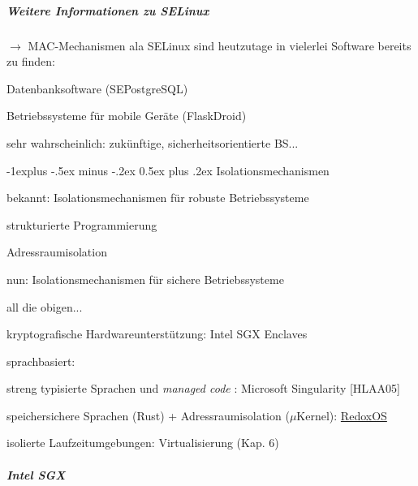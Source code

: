 \documentclass[a4paper]{article}
\makeatletter
\renewcommand{\subsection}{\@startsection{subsection}{2}{0mm}%
 {-1explus -.5ex minus -.2ex}%
 {0.5ex plus .2ex}%
 {\normalfont\normalsize\bfseries}}
\makeatother
\begin{document}
\begin{multicols}{3}
    \subparagraph{Weitere Informationen zu
        SELinux}

    $\rightarrow$ MAC-Mechanismen ala SELinux sind
    heutzutage in vielerlei Software bereits zu finden:

    \begin{itemize*}
        \item
        Datenbanksoftware (SEPostgreSQL)
        \item
        Betriebssysteme für mobile Geräte (FlaskDroid)
        \item
        sehr wahrscheinlich: zukünftige, sicherheitsorientierte BS...
    \end{itemize*}


    \subsection{Isolationsmechanismen}

    \begin{itemize*}
        \item
        bekannt: Isolationsmechanismen für robuste Betriebssysteme
        \begin{itemize*}
            \item strukturierte Programmierung
            \item Adressraumisolation
        \end{itemize*}
        \item
        nun: Isolationsmechanismen für sichere Betriebssysteme
        \begin{itemize*}
            \item all die obigen...
            \item kryptografische Hardwareunterstützung: Intel SGX Enclaves
            \item sprachbasiert: \begin{itemize*} \item streng typisierte Sprachen und \emph{managed code} : Microsoft Singularity {[}HLAA05{]} \item speichersichere Sprachen (Rust) + Adressraumisolation ($\mu$Kernel): \href{https://www.redox-os.org/}{RedoxOS} \end{itemize*}
            \item isolierte Laufzeitumgebungen: Virtualisierung (Kap. 6)
        \end{itemize*}
    \end{itemize*}


    \subparagraph{Intel SGX}


\end{multicols}
\end{document}
